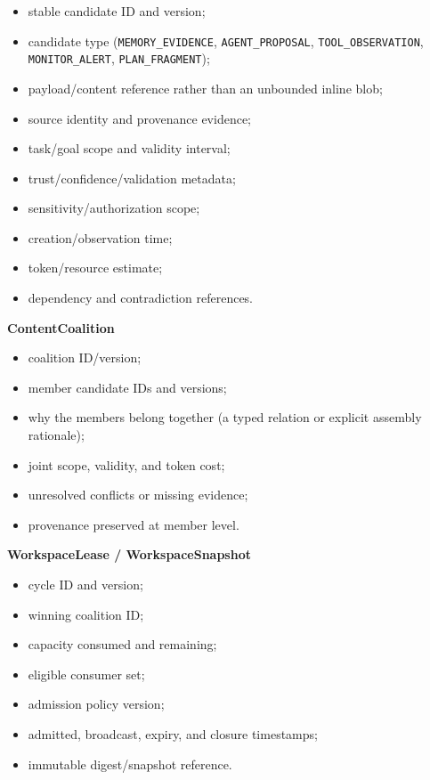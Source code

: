 \begin{itemize}
\tightlist
\item
  stable candidate ID and version;
\item
  candidate type (\texttt{MEMORY\_EVIDENCE}, \texttt{AGENT\_PROPOSAL}, \texttt{TOOL\_OBSERVATION}, \texttt{MONITOR\_ALERT}, \texttt{PLAN\_FRAGMENT});
\item
  payload/content reference rather than an unbounded inline blob;
\item
  source identity and provenance evidence;
\item
  task/goal scope and validity interval;
\item
  trust/confidence/validation metadata;
\item
  sensitivity/authorization scope;
\item
  creation/observation time;
\item
  token/resource estimate;
\item
  dependency and contradiction references.
\end{itemize}

\textbf{ContentCoalition}

\begin{itemize}
\tightlist
\item
  coalition ID/version;
\item
  member candidate IDs and versions;
\item
  why the members belong together (a typed relation or explicit assembly rationale);
\item
  joint scope, validity, and token cost;
\item
  unresolved conflicts or missing evidence;
\item
  provenance preserved at member level.
\end{itemize}

\textbf{WorkspaceLease / WorkspaceSnapshot}

\begin{itemize}
\tightlist
\item
  cycle ID and version;
\item
  winning coalition ID;
\item
  capacity consumed and remaining;
\item
  eligible consumer set;
\item
  admission policy version;
\item
  admitted, broadcast, expiry, and closure timestamps;
\item
  immutable digest/snapshot reference.
\end{itemize}

